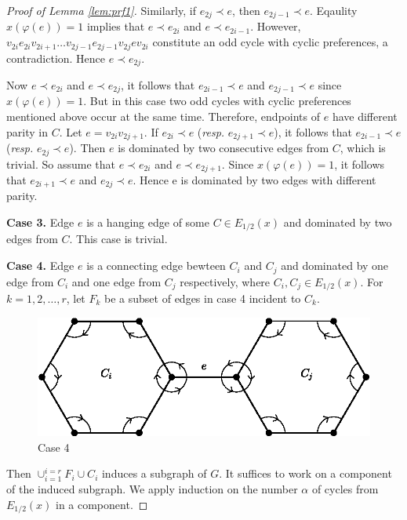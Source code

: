 \documentclass[11pt]{article}
\numberwithin{theorem}{section}
\begin{document}
\begin{proof}[Proof of Lemma \ref{lem:prf1}]
Similarly, if $e_{2j}\prec e$, then $e_{2j-1}\prec e$. Eqaulity $x(\varphi(e))=1$ implies that $e\prec e_{2i}$ and $e\prec e_{2i-1}$. However, $v_{2i} e_{2i} v_{2i+1} \ldots v_{2j-1} e_{2j-1} v_{2j} e v_{2i}$ constitute an odd cycle with cyclic preferences, a contradiction. Hence $e\prec e_{2j}$. 

Now $e\prec e_{2i}$ and $e\prec e_{2j}$, it follows that $e_{2i-1}\prec e$ and $e_{2j-1}\prec e$ since $x(\varphi(e))=1$. But in this case two odd cycles with cyclic preferences mentioned above occur at the same time. 
Therefore, endpoints of $e$ have different parity in $C$. Let $e=v_{2i} v_{2j+1}$.
If $e_{2i}\prec e$ (\textit{resp.} $e_{2j+1}\prec e$), it follows that $e_{2i-1}\prec e$ (\textit{resp.} $e_{2j}\prec e$). Then $e$ is dominated by two consecutive edges from $C$, which is trivial.  So assume that $e\prec e_{2i}$ and $e\prec e_{2j+1}$. Since $x(\varphi(e))=1$, it follows that $e_{2i+1}\prec e$ and $e_{2j}\prec e$. Hence e is dominated by two edges with different parity.

\textbf{Case 3.} Edge $e$ is a hanging edge of some $C\in E_{1/2}(x)$ and dominated by two edges from $C$. This case is trivial.

\textbf{Case 4.} Edge $e$ is a connecting edge bewteen $C_i$ and $C_j$ and dominated by one edge from $C_i$ and one edge from $C_j$ respectively, where $C_i, C_j \in E_{1/2}(x)$.
For $k=1,2,\ldots,r$, let $F_k$ be a subset of edges in case 4 incident to $C_k$.
\begin{figure}
\centering
\includegraphics[scale=0.85]{KernelMengerianO-fig2}
\caption{Case 4}
\end{figure}
Then $\cup_{i=1}^{i=r} F_i\cup C_i$ induces a subgraph of $G$. It suffices to work on a component of the induced subgraph. We apply induction on the number $\alpha$ of cycles from $E_{1/2}(x)$ in a component.


\end{proof}
\end{document}
